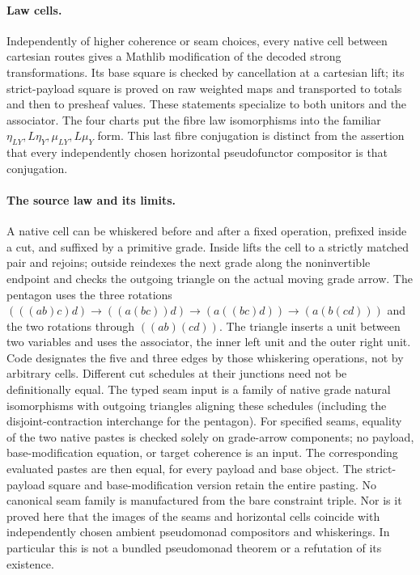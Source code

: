 \documentclass[11pt]{article}
\begin{document}
\paragraph{Law cells.} Independently of higher coherence or seam choices, every
native cell between cartesian routes gives a Mathlib modification of the decoded
strong transformations. Its base square is checked by cancellation at a
cartesian lift; its strict-payload square is proved on raw weighted maps and
transported to totals and then to presheaf values. These statements specialize
to both unitors and the associator. The four charts put the fibre law
isomorphisms into the familiar $\eta_{LY},L\eta_Y,\mu_{LY},L\mu_Y$ form.
This last fibre conjugation is distinct from the assertion that every independently
chosen horizontal pseudofunctor compositor is that conjugation.
\paragraph{The source law and its limits.} A native cell can be whiskered before
and after a fixed operation, prefixed inside a cut, and suffixed by a primitive
grade. Inside lifts the cell to a strictly matched pair and rejoins; outside
reindexes the next grade along the noninvertible endpoint and checks the outgoing
triangle on the actual moving grade arrow. The pentagon uses the three rotations
$(((ab)c)d)\to((a(bc))d)\to(a((bc)d))\to(a(b(cd)))$ and the two rotations through
$((ab)(cd))$. The triangle inserts a unit between two variables and uses the
associator, the inner left unit and the outer right unit. Code designates the
five and three edges by those whiskering operations, not by arbitrary cells.
Different cut schedules at their junctions need not be definitionally equal.
The typed seam input is a family of native grade natural isomorphisms with
outgoing triangles aligning these schedules (including the disjoint-contraction
interchange for the pentagon). For specified seams, equality of the two native
pastes is checked solely on grade-arrow components; no payload, base-modification
equation, or target coherence is an input. The corresponding evaluated pastes
are then equal, for every payload and base object. The strict-payload square
and base-modification version retain the entire pasting. No canonical seam family
is manufactured from the bare constraint triple. Nor is it proved here that
the images of the seams and horizontal cells coincide with independently
chosen ambient pseudomonad compositors and whiskerings. In particular this
is not a bundled pseudomonad theorem or a refutation of its existence.
\end{document}
